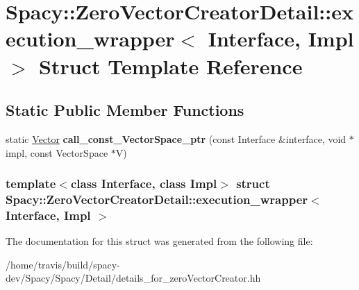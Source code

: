 \hypertarget{structSpacy_1_1ZeroVectorCreatorDetail_1_1execution__wrapper}{\section{\-Spacy\-:\-:\-Zero\-Vector\-Creator\-Detail\-:\-:execution\-\_\-wrapper$<$ \-Interface, \-Impl $>$ \-Struct \-Template \-Reference}
\label{structSpacy_1_1ZeroVectorCreatorDetail_1_1execution__wrapper}
}
\subsection*{\-Static \-Public \-Member \-Functions}
\begin{DoxyCompactItemize}
\item 
\hypertarget{structSpacy_1_1ZeroVectorCreatorDetail_1_1execution__wrapper_a3b807a3f02e8c53901eff97a8598e3ca}{static \hyperlink{classSpacy_1_1Vector}{\-Vector} {\bfseries call\-\_\-const\-\_\-\-Vector\-Space\-\_\-ptr} (const \-Interface \&interface, void $\ast$impl, const \-Vector\-Space $\ast$\-V)}\label{structSpacy_1_1ZeroVectorCreatorDetail_1_1execution__wrapper_a3b807a3f02e8c53901eff97a8598e3ca}

\end{DoxyCompactItemize}
\subsubsection*{template$<$class Interface, class Impl$>$ struct Spacy\-::\-Zero\-Vector\-Creator\-Detail\-::execution\-\_\-wrapper$<$ Interface, Impl $>$}



\-The documentation for this struct was generated from the following file\-:\begin{DoxyCompactItemize}
\item 
/home/travis/build/spacy-\/dev/\-Spacy/\-Spacy/\-Detail/details\-\_\-for\-\_\-zero\-Vector\-Creator.\-hh\end{DoxyCompactItemize}
